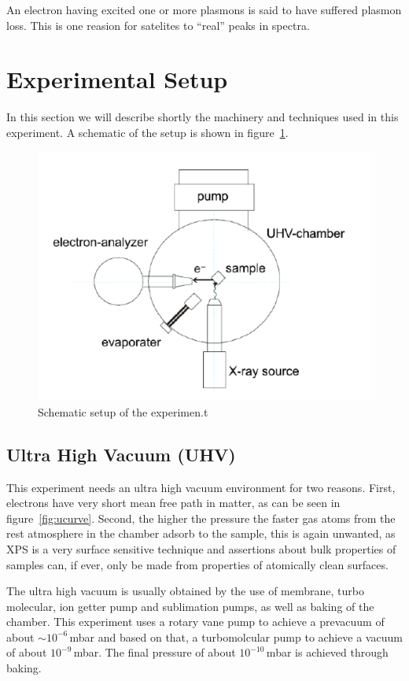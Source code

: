 \documentclass[a4paper,10pt]{scrartcl}
\begin{document}
An electron having excited one or more plasmons is said to have suffered plasmon loss. This is one reasion for satelites to ``real'' peaks in spectra.

\section{Experimental Setup}

In this section we will describe shortly the machinery and techniques used in this experiment. A schematic of the setup is shown in figure~\ref{fig:setup}.

\begin{figure}
\centering
\includegraphics[scale=0.4]{img/setup}
\caption{Schematic setup of the experimen.t \label{fig:setup}}
\end{figure}


\subsection{Ultra High Vacuum (UHV)}

This experiment needs an ultra high vacuum environment for two reasons. First, electrons have very short mean free path in matter, as can be seen in figure~\ref{fig:ucurve}. Second, the higher the pressure the faster gas atoms from the rest atmosphere in the chamber adsorb to the sample, this is again unwanted, as XPS is a very surface sensitive technique and assertions about bulk properties of samples can, if ever, only be made from properties of atomically clean surfaces.

The ultra high vacuum is usually obtained by the use of membrane, turbo molecular, ion getter pump and sublimation pumps, as well as baking of the chamber. This experiment uses a rotary vane pump to achieve a prevacuum of about $\sim 10^{-6}\,$mbar and based on that, a turbomolcular pump to achieve a vacuum of about $10^{-9}\,$mbar. The final pressure of about $10^{-10}\,$mbar is achieved through baking.
\end{document}
